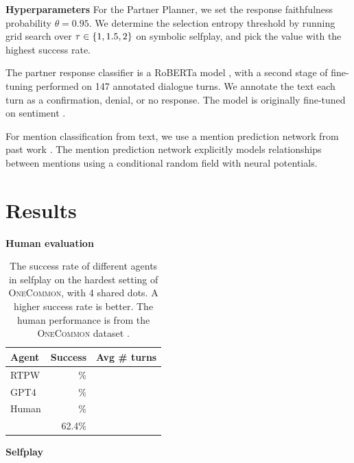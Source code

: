 \documentclass[11pt]{article}
\newcommand{\system}{RTPW}
\newcommand{\justin}[1]{{{\textcolor{purple}{(Justin: #1)}}}}
\begin{document}

\textbf{Hyperparameters}
For the Partner Planner, we set the response faithfulness probability $\theta = 0.95$.
We determine the selection entropy threshold by running grid search over $\tau \in \left\{1,1.5,2\right\}$ on symbolic selfplay, and pick the value with the highest success rate.

The partner response classifier is a RoBERTa model \citep{roberta}, with a second stage of fine-tuning performed on 147 annotated dialogue turns.
We annotate the text each turn as a confirmation, denial, or no response.
The model is originally fine-tuned on sentiment \citep{heitmann2020}.

For mention classification from text, we use a mention prediction network from past work \citep{fried}.
The mention prediction network explicitly models relationships between mentions using a conditional random field with neural potentials.

\section{Results}

\textbf{Human evaluation}


\begin{table}[!t]
\centering
\begin{tabular}{lrr}
\toprule
Agent                   & Success & Avg \# turns\\
\midrule
\system{}               & \%        & \\
GPT4                    & \%  & \\
Human                   & \%  & \\
\citet{fried}           & 62.4\%  & \\
\bottomrule
\end{tabular}
\caption{\label{tbl:human-eval}
The success rate of different agents in selfplay on the hardest setting of \textsc{OneCommon}, with 4 shared dots.
A higher success rate is better.
The human performance is from the \textsc{OneCommon} dataset
\citep{onecommon}.
}
\end{table}

\textbf{Selfplay}
\end{document}
